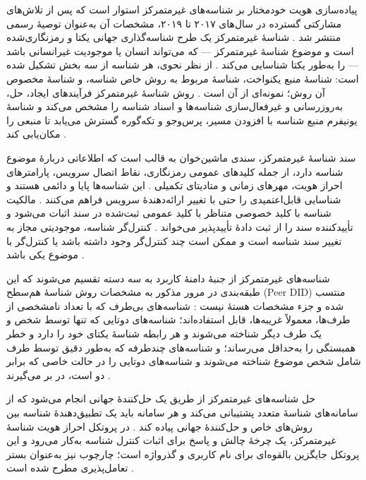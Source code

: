 پیاده‌سازی هویت خودمختار بر شناسه‌های غیرمتمرکز  استوار است که پس از تلاش‌های مشارکتی گسترده در سال‌های ۲۰۱۷ تا ۲۰۱۹، مشخصات آن به‌عنوان توصیهٔ رسمی  منتشر شد \cite{mazzocca2025survey}. شناسهٔ غیرمتمرکز یک طرح شناسه‌گذاری جهانی یکتا و رمزنگاری‌شده است و موضوع شناسهٔ غیرمتمرکز — که می‌تواند انسان یا موجودیت غیرانسانی باشد — را به‌طور یکتا شناسایی می‌کند \cite{mazzocca2025survey}. از نظر نحوی، هر شناسه از سه بخش تشکیل شده است: شناسهٔ منبع یکنواخت، شناسهٔ مربوط به روش خاص شناسه، و شناسهٔ مخصوص آن روش؛ نمونه‌ای از آن  است \cite{mazzocca2025survey}. روش شناسهٔ غیرمتمرکز فرآیندهای ایجاد، حل، به‌روزرسانی و غیرفعال‌سازی شناسه‌ها و اسناد شناسه را مشخص می‌کند و شناسهٔ یونیفرم منبع شناسه با افزودن مسیر، پرس‌وجو و تکه‌گوره گسترش می‌یابد تا منبعی را مکان‌یابی کند \cite{mazzocca2025survey}.

سند شناسهٔ غیرمتمرکز، سندی ماشین‌خوان به قالب  است که اطلاعاتی دربارهٔ موضوع شناسه دارد، از جمله کلیدهای عمومی رمزنگاری، نقاط اتصال سرویس، پارامترهای احراز هویت، مهرهای زمانی و متادیتای تکمیلی \cite{mazzocca2025survey}. این شناسه‌ها پایا و دائمی هستند و شناسایی قابل‌اعتمیدی را حتی با تغییر ارائه‌دهندهٔ سرویس فراهم می‌کنند \cite{mazzocca2025survey}. مالکیت شناسه با کلید خصوصی متناظر با کلید عمومی ثبت‌شده در سند اثبات می‌شود و تأییدکننده سند را از ثبت دادهٔ تأییدپذیر می‌خواند \cite{mazzocca2025survey}. کنترل‌گر شناسه، موجودیتی مجاز به تغییر سند شناسه است و ممکن است چند کنترل‌گر وجود داشته باشد یا کنترل‌گر با موضوع یکی باشد \cite{mazzocca2025survey}.

شناسه‌های غیرمتمرکز از جنبهٔ دامنهٔ کاربرد به سه دسته تقسیم می‌شوند که این طبقه‌بندی در مرور مذکور به مشخصات روش شناسهٔ هم‌سطح (Peer DID) منتسب شده و جزء مشخصات هستهٔ  نیست \cite{mazzocca2025survey}: شناسه‌های بی‌طرف  که با تعداد نامشخصی از طرف‌ها، معمولاً غریبه‌ها، قابل استفاده‌اند؛ شناسه‌های دوتایی  که تنها توسط شخص و یک طرف دیگر شناخته می‌شوند و هر رابطه شناسهٔ یکتای خود را دارد و خطر همبستگی را به‌حداقل می‌رساند؛ و شناسه‌های چندطرفه  که به‌طور دقیق توسط  طرف شامل شخص موضوع شناخته می‌شوند و شناسه‌های دوتایی را در حالت خاصی که  برابر دو است، در بر می‌گیرند \cite{mazzocca2025survey}.

حل شناسه‌های غیرمتمرکز از طریق یک حل‌کنندهٔ جهانی انجام می‌شود که از سامانه‌های شناسهٔ متعدد پشتیبانی می‌کند و هر سامانه باید یک تطبیق‌دهندهٔ شناسه بین روش‌های خاص و حل‌کنندهٔ جهانی پیاده کند \cite{mazzocca2025survey}. در پروتکل احراز هویت شناسهٔ غیرمتمرکز، یک چرخهٔ چالش و پاسخ برای اثبات کنترل شناسه به‌کار می‌رود و این پروتکل جایگزین بالقوه‌ای برای نام کاربری و گذرواژه است؛ چارچوب  نیز به‌عنوان بستر تعامل‌پذیری مطرح شده است \cite{mazzocca2025survey}.

